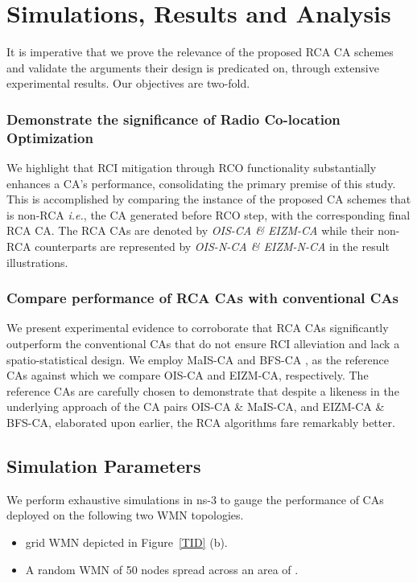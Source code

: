 \documentclass[conference]{IEEEtran}
\begin{document}
\section{Simulations, Results and Analysis}
It is imperative that we prove the relevance of the proposed RCA CA schemes and validate the arguments their design is predicated on, through extensive experimental results. Our objectives are two-fold. 
\subsubsection{Demonstrate the significance of Radio Co-location Optimization} We highlight that RCI mitigation through RCO functionality substantially enhances a CA's performance, consolidating the primary premise of this study. This is accomplished by comparing the instance of the proposed CA schemes that is non-RCA \emph{i.e.}, the CA generated before RCO step, with the corresponding final RCA CA. The RCA CAs are denoted by \textit{OIS-CA \& EIZM-CA} while their non-RCA counterparts are represented by \textit{OIS-N-CA \& EIZM-N-CA} in the result illustrations. 
\subsubsection{Compare performance of RCA CAs with conventional CAs} We present experimental evidence to corroborate that RCA CAs significantly outperform the conventional CAs that do not ensure RCI alleviation and lack a spatio-statistical design. We employ MaIS-CA \cite{24Aizaz} and BFS-CA \cite{22Ramachandran}, as the reference CAs against which we compare OIS-CA and EIZM-CA, respectively. The reference CAs are carefully chosen to demonstrate that despite a likeness in the underlying approach of the CA pairs OIS-CA \& MaIS-CA, and EIZM-CA \& BFS-CA, elaborated upon earlier, the RCA algorithms fare remarkably better.




\subsection{Simulation Parameters}

We perform exhaustive simulations in ns-3 \cite{NS-3} to gauge the performance of CAs deployed on the following two WMN topologies.
\begin{itemize}
 \item  grid WMN depicted in Figure~\ref{TID} (b).
 \item A random WMN of 50 nodes spread across an area of .
\end{itemize}
\end{document}
